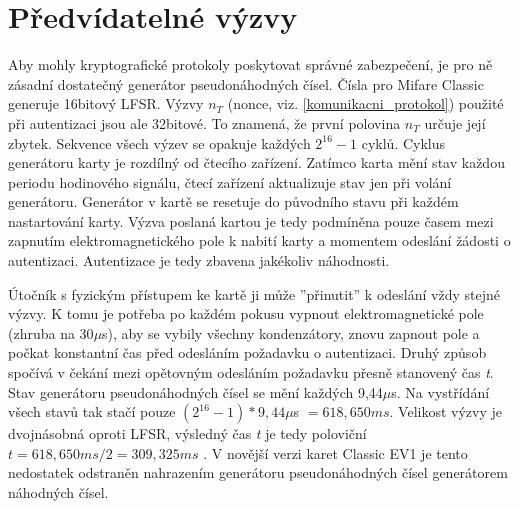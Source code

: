 \section{Předvídatelné výzvy}
\label{predvidatelne_nonce}
Aby mohly kryptografické protokoly poskytovat správné zabezpečení, je pro ně zásadní dostatečný generátor pseudonáhodných čísel. Čísla pro Mifare Classic generuje 16bitový LFSR. Výzvy $n_T$ (nonce, viz. \ref{komunikacni_protokol}) použité při autentizaci jsou ale 32bitové. To znamená, že první polovina $n_T$ určuje její zbytek. Sekvence všech výzev se opakuje každých $2^{16} - 1$ cyklů\cite{Cryptanalisis}. Cyklus generátoru karty je rozdílný od čtecího zařízení. Zatímco karta mění stav každou periodu hodinového signálu, čtecí zařízení aktualizuje stav jen při volání generátoru\cite{Dismantling_Mifare_Classic}. Generátor v kartě se resetuje do původního stavu při každém nastartování karty. Výzva poslaná kartou je tedy podmíněna pouze časem mezi zapnutím elektromagnetického pole k nabití karty a momentem odeslání žádosti o autentizaci. Autentizace je tedy zbavena jakékoliv náhodnosti. \par
Útočník s fyzickým přístupem ke kartě ji může ''přinutit'' k odeslání vždy stejné výzvy. K tomu je potřeba po každém pokusu vypnout elektromagnetické pole (zhruba na 30$\mu$s), aby se vybily všechny kondenzátory, znovu zapnout pole a počkat konstantní čas před odesláním požadavku o autentizaci. Druhý způsob spočívá v čekání mezi opětovným odesláním požadavku přesně stanovený čas \emph{t}. Stav generátoru pseudonáhodných čísel se mění každých 9,44$\mu$s. Na vystřídání všech stavů tak stačí pouze $(2^{16} - 1) * 9,44\mu$s $= 618,650ms$. Velikost výzvy je dvojnásobná oproti LFSR, výsledný čas \emph{t} je tedy poloviční $t = 618,650ms/2 = 309,325ms$ \cite{Wirelessly_Pickpocketing}. V novější verzi karet Classic EV1 je tento nedostatek odstraněn nahrazením generátoru pseudonáhodných čísel generátorem náhodných čísel\cite{Mifare_Classic_Official_about}.

